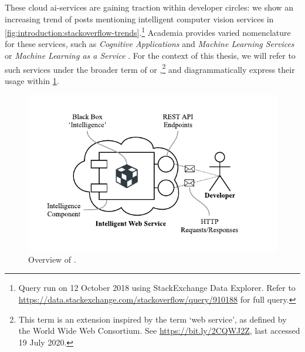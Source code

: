 These cloud \gls{ai}-services are gaining traction within developer circles: we show an increasing trend of  posts mentioning intelligent computer vision services in \cref{fig:introduction:stackoverflow-trends}.\footnote{Query run on 12 October 2018 using StackExchange Data Explorer. Refer to \url{https://data.stackexchange.com/stackoverflow/query/910188} for full query.}
Academia provides varied nomenclature for these services, such as \textit{Cognitive Applications} and \textit{Machine Learning Services} \citep{Hwang:2017tr} or \textit{Machine Learning as a Service} \citep{Ribeiro:2015dz}. 
For the context of this thesis, we will refer to such services under the broader term of \textbf{} or \textbf{},\footnote{This term is an extension inspired by the term `web service', as defined by the World Wide Web Consortium. See \url{https://bit.ly/2CQWJ2Z}, last accessed 19 July 2020.} and diagrammatically express their usage within \cref{fig:introduction:cloud-intelliegnce-service}.

\begin{figure}[h!]
\centering
\includegraphics[width=0.8\linewidth]{cloud-intelliegnce-service}
\caption[Overview of intelligent web services]{Overview of .}
\label{fig:introduction:cloud-intelliegnce-service}
\end{figure}

